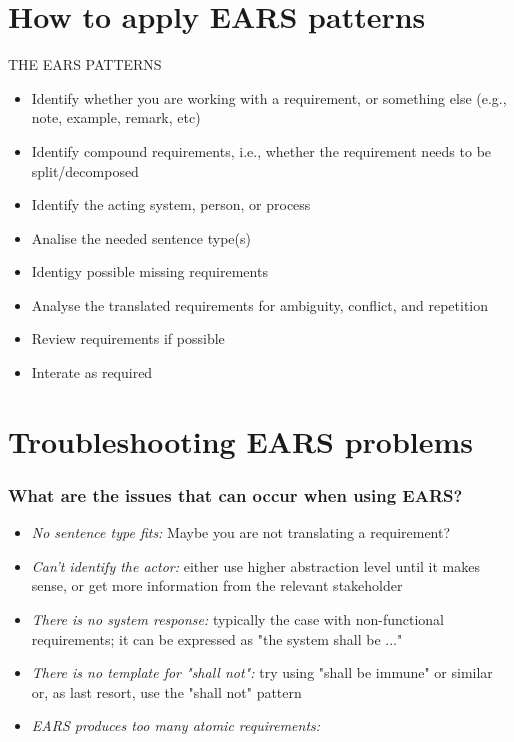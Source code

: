 \documentclass[aspectratio=169]{beamer}
\begin{document}
\section*{How to apply EARS patterns}

\begin{slide}{THE EARS PATTERNS}
  \begin{itemize}
  \item Identify whether you are working with a requirement, or something else (e.g., note, example, remark, etc)
  \item Identify compound requirements, i.e., whether the requirement needs to be split/decomposed 
  \item Identify the acting system, person, or process
  \item Analise the needed sentence type(s)
  \item Identigy possible missing requirements
  \item Analyse the translated requirements for ambiguity, conflict, and repetition
  \item Review requirements if possible
  \item Interate as required
  \end{itemize}
\end{slide}

\section*{Troubleshooting EARS problems}

\begin{frame}
  \frametitle{What are the issues that can occur when using EARS?}
  \begin{itemize}
  \item {\it No sentence type fits:} Maybe you are not translating a requirement?
  \item {\it Can't identify the actor:} either use higher abstraction level until it makes sense, or get more information from the relevant stakeholder
  \item {\it There is no system response:}  typically the case with non-functional requirements; it can be expressed as "the system shall be ..."
  \item {\it There is no template for "shall not":} try using "shall be immune" or similar or, as last resort, use the "shall not" pattern
  \item {\it EARS produces too many atomic requirements:} 
  \end{itemize}
  
\end{frame}
\end{document}
